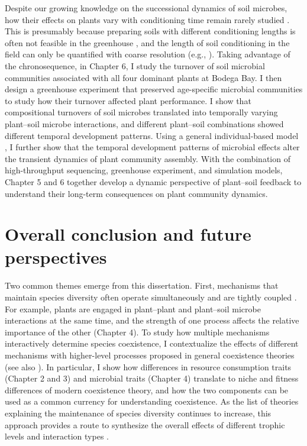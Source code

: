 Despite our growing knowledge on the successional dynamics of soil microbes, how their effects on plants vary with conditioning time remain rarely studied \citep{Kardol2013, Lepinay2018}. This is presumably because preparing soils with different conditioning lengths is often not feasible in the greenhouse \citep{Kardol2013, Kulmatiski2018}, and the length of soil conditioning in the field can only be quantified with coarse resolution (e.g., \citealp{Day2015, Speek2015}). 
Taking advantage of the chronosequence, in Chapter 6, I study the turnover of soil microbial communities associated with all four dominant plants at Bodega Bay. I then design a greenhouse experiment that preserved age-specific microbial communities to study how their turnover affected plant performance.
I show that compositional turnovers of soil microbes translated into temporally varying plant--soil microbe interactions, and different plant--soil combinations showed different temporal development patterns. 
Using a general individual-based model \citep{Fukami2013}, I further show that the temporal development patterns of microbial effects alter the transient dynamics of plant community assembly. 
With the combination of high-throughput sequencing, greenhouse experiment, and simulation models, Chapter 5 and 6 together develop a dynamic perspective of plant--soil feedback to understand their long-term consequences on plant community dynamics.
\par


\section{Overall conclusion and future perspectives}
Two common themes emerge from this dissertation. First, mechanisms that maintain species diversity often operate simultaneously and are tightly coupled \citep{Amarasekare2007, Letten2018}. For example, plants are engaged in plant--plant and plant--soil microbe interactions at the same time, and the strength of one process affects the relative importance of the other (Chapter 4). To study how multiple mechanisms interactively determine species coexistence, I contextualize the effects of different mechanisms with higher-level processes proposed in general coexistence theories (see also \citealp{Vellend2016}). In particular, I show how differences in resource consumption traits (Chapter 2 and 3) and microbial traits (Chapter 4) translate to niche and fitness differences of modern coexistence theory, and how the two components can be used as a common currency for understanding coexistence. As the list of theories explaining the maintenance of species diversity continues to increase, this approach provides a route to synthesize the overall effects of different trophic levels and interaction types \citep{Bartomeus2018, Lanuza2018}.
\par


